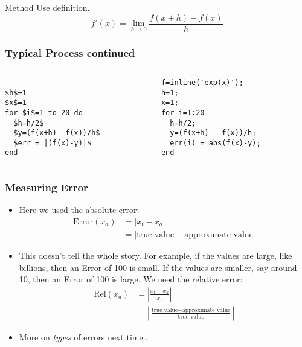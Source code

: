 \documentclass[10pt]{beamer}
\begin{document}
\begin{frame}[fragile]
\begin{block}{Method}
  Use definition.
  \begin{equation*} 
    f'(x) = \lim_{h\rightarrow 0} \frac{f(x+h) - f(x)}{h}
\end{equation*}
\end{block}
\frametitle{Typical Process continued}
\begin{columns}
\begin{column}{0.45\textwidth}
\begin{lstlisting}[mathescape,caption=psuedo]

$h$=1
$x$=1  
for $i$=1 to 20 do
  $h=h/2$
  $y=(f(x+h)- f(x))/h$
  $err = |(f(x)-y)|$
end
\end{lstlisting}
\end{column}

\begin{column}{0.45\textwidth}
\begin{lstlisting}[caption=Matlab]
f=inline('exp(x)');
h=1;
x=1;
for i=1:20
  h=h/2;
  y=(f(x+h) - f(x))/h;
  err(i) = abs(f(x)-y);
end
\end{lstlisting}
\end{column}
\end{columns}
\end{frame}
\begin{frame}
\frametitle{Measuring Error}
  \begin{itemize}
    \item Here we used the absolute error:
  \begin{align*}
    \text{Error}(x_a) &= |x_t - x_a|\\
  & = |\text{true value} - \text{approximate value}|
  \end{align*}

    \item This doesn't tell the whole story.  For example, if the values
are large, like billions, then an Error of 100 is small.  If the values
are smaller, say around 10, then an Error of 100 is large.  We need the
relative error:
  \begin{align*}
    \text{Rel}(x_a) &= \left|\frac{x_t - x_a}{x_t}\right|\\
  & = \left|\frac{\text{true value} - \text{approximate value}}{\text{true
value}}\right|
  \end{align*}
  \item More on \emph{types} of errors next time...
\end{itemize}
\end{frame}
\end{document}
